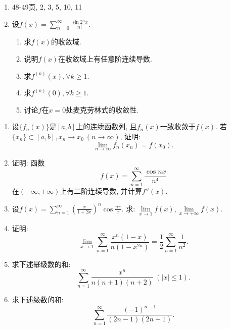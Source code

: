\documentclass[UTF8,11pt, a4paper, oneside, fontset=none]{ctexbook}
\begin{document}
\begin{enumerate}

\item 48-49页, 2, 3, 5, 10, 11


\item 设$f(x) = \sum_{n=0}^{\infty} \frac{\sin 2^n x}{n!}$. 

\begin{enumerate}

\item 求$f(x)$的收敛域.

\item 说明$f(x)$在收敛域上有任意阶连续导数.

\item 求$f^{(k)}(x), \forall k \geq 1$.

\item 求$f^{(k)}(0), \forall k \geq 1$.

\item 讨论$f$在$x = 0$处麦克劳林式的收敛性. 

\end{enumerate}

\end{enumerate}

\begin{enumerate}

\item 设$\{ f_n(x) \}$是$[a, b]$上的连续函数列, 且$f_n(x)$一致收敛于$f(x)$. 若$\{ x_n \} \subset [a, b], x_n \to x_0 \ (n \to \infty)$, 证明:
\[
\lim_{n \to \infty} f_n(x_n) = f(x_0).
\]


\item 证明: 函数
\[
f(x) = \sum_{n=1}^{\infty} \frac{\cos nx}{n^4}
\]
在$(-\infty, +\infty)$上有二阶连续导数, 并计算$f''(x)$.

\item 设$f(x) = \sum_{n=1}^{\infty} \left( \frac{x}{1 + 2x} \right)^n \cos \frac{n \pi}{x}$. 求: $\lim\limits_{x \to 1} f(x), \lim\limits_{x \to +\infty} f(x)$.

\item 证明:
\[
\lim_{x \to 1} \sum_{n=1}^{\infty} \frac{x^n(1 - x)}{n(1 - x^{2n})} = \frac{1}{2} \sum_{n=1}^{\infty} \frac{1}{n^2}.
\]



\item 求下述幂级数的和:
\[
\sum_{n=1}^{\infty} \frac{x^n}{n(n+1)(n+2)} \ (|x| \leq 1).
\]


\item 求下述级数的和:
\[
\sum_{n=1}^{\infty} \frac{(-1)^{n-1}}{(2n-1)(2n+1)}.
\]

\end{enumerate}
\end{document}

